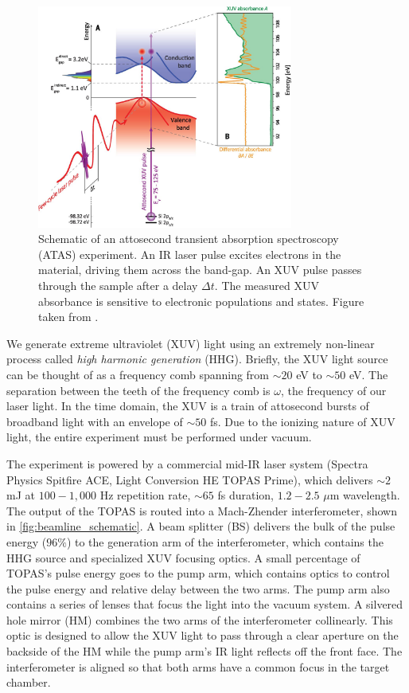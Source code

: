\begin{figure}
	\centering
	\includegraphics[width=0.75\textwidth]{figures/chap3/ATAS_Cartoon_Si_Leone.jpg}
	\caption{Schematic of an attosecond transient absorption spectroscopy (ATAS) experiment. An IR laser pulse excites electrons in the material, driving them across the band-gap. An XUV pulse passes through the sample after a delay $\Delta t$. The measured XUV absorbance is sensitive to electronic populations and states. Figure taken from \cite{schultzeAttosecondBandgapDynamics2014}.}
	\label{fig:ATAS_Cartoon_Si_Leone}
\end{figure}

We generate extreme ultraviolet (XUV) light using an extremely non-linear process called \textit{high harmonic generation} (HHG). Briefly, the XUV light source can be thought of as a frequency comb spanning from $\sim20$ eV to $\sim50$ eV. The separation between the teeth of the frequency comb is $\omega$, the frequency of our laser light. In the time domain, the XUV is a train of attosecond bursts of broadband light with an envelope of $\sim50$ fs. Due to the ionizing nature of XUV light, the entire experiment must be performed under vacuum.

The experiment is powered by a commercial mid-IR laser system (Spectra Physics Spitfire ACE, Light Conversion HE TOPAS Prime), which delivers $\sim2$ mJ at $100 - 1,000$ Hz repetition rate, $\sim65$ fs duration, $1.2 - 2.5$ $\mu$m wavelength. The output of the TOPAS is routed into a Mach-Zhender interferometer, shown in \cref{fig:beamline_schematic}. A beam splitter (BS) delivers the bulk of the pulse energy ($96\%$) to the generation arm of the interferometer, which contains the HHG source and specialized XUV focusing optics. A small percentage of TOPAS's pulse energy goes to the pump arm, which contains optics to control the pulse energy and relative delay between the two arms. The pump arm also contains a series of lenses that focus the light into the vacuum system. A silvered hole mirror (HM) combines the two arms of the interferometer collinearly. This optic is designed to allow the XUV light to pass through a clear aperture on the backside of the HM while the pump arm's IR light reflects off the front face. The interferometer is aligned so that both arms have a common focus in the target chamber.

